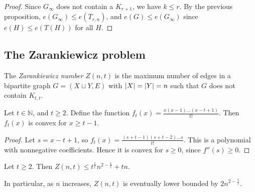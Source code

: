 \begin{proof}
	Since \( G_\infty \) does not contain a \( K_{r+1} \), we have \( k \leq r \).
	By the previous proposition, \( e(G_\infty) \leq e(T_{r,n}) \), and \( e(G) \leq e(G_\infty) \) since \( e(H) \leq e(T(H)) \) for all \( H \).
\end{proof}

\subsection{The Zarankiewicz problem}
\begin{definition}
	The \emph{Zarankiewicz number} \( Z(n,t) \) is the maximum number of edges in a bipartite graph \( G = (X \sqcup Y, E) \) with \( \abs{X} = \abs{Y} = n \) such that \( G \) does not contain \( K_{t,t} \).
\end{definition}
\begin{lemma}
	Let \( t \in \mathbb N \), and \( t \geq 2 \).
	Define the function \( f_t(x) = \frac{x(x-1)\dots(x-t+1)}{t!} \).
	Then \( f_t(x) \) is convex for \( x \geq t - 1 \).
\end{lemma}
\begin{proof}
	Let \( s = x - t + 1 \), so \( f_t(x) = \frac{(s+t-1)(s+t-2)\dots s}{t!} \).
	This is a polynomial with nonnegative coefficients.
	Hence it is convex for \( s \geq 0 \), since \( f''(s) \geq 0 \).
\end{proof}
\begin{theorem}
	Let \( t \geq 2 \).
	Then \( Z(n,t) \leq t^{\frac{1}{t}} n^{2 - \frac{1}{t}} + tn \).
\end{theorem}
\begin{remark}
	In particular, as \( n \) increases, \( Z(n,t) \) is eventually lower bounded by \( 2n^{2-\frac{1}{t}} \).
\end{remark}
